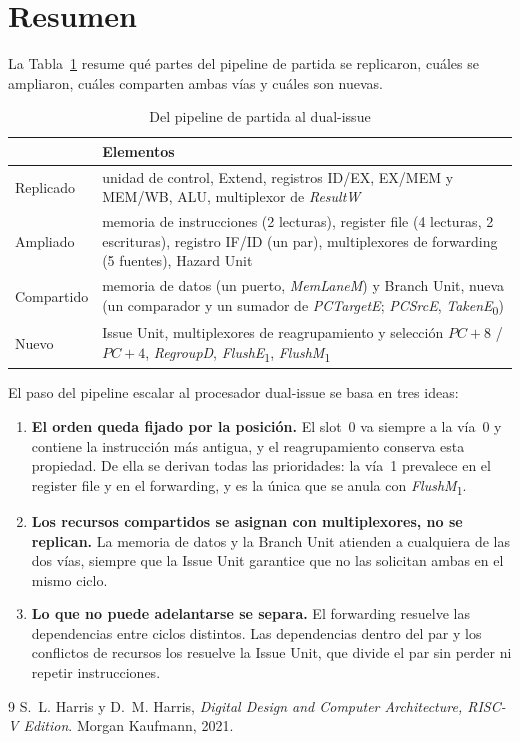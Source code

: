 \documentclass[11pt,a4paper]{article}
\newcommand{\sig}[1]{\textit{#1}}
\newcommand{\sigk}[2]{\textit{#1}\textsubscript{#2}}
\begin{document}
\section{Resumen}
\label{sec:summary}

La Tabla~\ref{tab:summary} resume qué partes del pipeline de partida se replicaron, cuáles
se ampliaron, cuáles comparten ambas vías y cuáles son nuevas.

\begin{table}[htbp]
\centering\small
\caption{Del pipeline de partida al dual-issue}
\label{tab:summary}
\begin{tabular}{@{}l>{\raggedright\arraybackslash}p{11cm}@{}}
\toprule
& Elementos \\
\midrule
Replicado & unidad de control, Extend, registros ID/EX, EX/MEM y MEM/WB, ALU,
            multiplexor de \sig{ResultW} \\
Ampliado & memoria de instrucciones (2 lecturas), register file (4 lecturas, 2
           escrituras), registro IF/ID (un par), multiplexores de forwarding (5 fuentes),
           Hazard Unit \\
Compartido & memoria de datos (un puerto, \sig{MemLaneM}) y Branch Unit, nueva (un comparador y
             un sumador de \sig{PCTargetE}; \sig{PCSrcE}, \sigk{TakenE}{0}) \\
Nuevo & Issue Unit, multiplexores de reagrupamiento y selección
        $\sig{PC}+8$ / $\sig{PC}+4$, \sig{RegroupD}, \sigk{FlushE}{1}, \sigk{FlushM}{1} \\
\bottomrule
\end{tabular}
\end{table}

El paso del pipeline escalar al procesador dual-issue se basa en tres ideas:
\begin{enumerate}
  \item \textbf{El orden queda fijado por la posición.} El slot~0 va siempre a la vía~0 y
        contiene la instrucción más antigua, y el reagrupamiento conserva esta propiedad.
        De ella se derivan todas las prioridades: la vía~1 prevalece en el register file y
        en el forwarding, y es la única que se anula con \sigk{FlushM}{1}.
  \item \textbf{Los recursos compartidos se asignan con multiplexores, no se replican.} La
        memoria de datos y la Branch Unit atienden a cualquiera de las dos vías, siempre
        que la Issue Unit garantice que no las solicitan ambas en el mismo ciclo.
  \item \textbf{Lo que no puede adelantarse se separa.} El forwarding resuelve las
        dependencias entre ciclos distintos. Las dependencias dentro del par y los
        conflictos de recursos los resuelve la Issue Unit, que divide el par sin perder
        ni repetir instrucciones.
\end{enumerate}

\begin{thebibliography}{9}
 S.~L. Harris y D.~M. Harris, \emph{Digital Design and Computer
  Architecture, RISC-V Edition}. Morgan Kaufmann, 2021.
\end{thebibliography}
\end{document}
